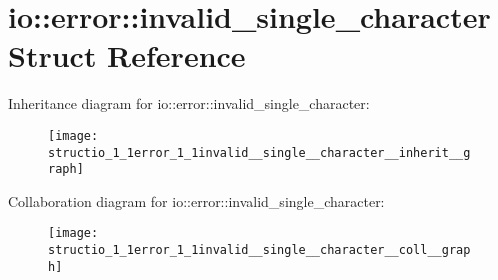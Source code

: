 \hypertarget{structio_1_1error_1_1invalid__single__character}{}\section{io\+:\+:error\+:\+:invalid\+\_\+single\+\_\+character Struct Reference}
\label{structio_1_1error_1_1invalid__single__character}


Inheritance diagram for io\+:\+:error\+:\+:invalid\+\_\+single\+\_\+character\+:\nopagebreak
\begin{figure}[H]
\begin{center}
\leavevmode
\texttt{[image: structio\_1\_1error\_1\_1invalid\_\_single\_\_character\_\_inherit\_\_graph]}
\end{center}
\end{figure}


Collaboration diagram for io\+:\+:error\+:\+:invalid\+\_\+single\+\_\+character\+:\nopagebreak
\begin{figure}[H]
\begin{center}
\leavevmode
\texttt{[image: structio\_1\_1error\_1\_1invalid\_\_single\_\_character\_\_coll\_\_graph]}
\end{center}
\end{figure}
